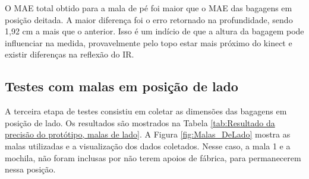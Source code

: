 \begin{table}[h!]
\centering
{}
\caption{Resultado da exatidão do protótipo, malas de pé }
\label{tab:Resultado da preciso do prottipo malas de pe}
\end{table}


    O MAE total obtido para a mala de pé foi maior que o MAE das bagagens em posição deitada. A maior diferença foi o erro retornado na profundidade, sendo 1,92 cm a mais que o anterior. Isso é um indício de que a altura da bagagem pode influenciar na medida, provavelmente pelo topo estar mais próximo do kinect e existir diferenças na reflexão do IR.




\subsection{Testes com malas em posição de lado}
\label{sec_Testes com mala em posição de lado}

A terceira etapa de testes consistiu em coletar as dimensões das bagagens em posição de lado. Os resultados são mostrados na Tabela \ref{tab:Resultado da precisão do protótipo, malas de lado}. A Figura \ref{fig:Malas_DeLado} mostra as malas utilizadas e a visualização dos dados coletados. Nesse caso, a mala 1 e a mochila, não foram inclusas por não terem apoios de fábrica, para permanecerem nessa posição. 

